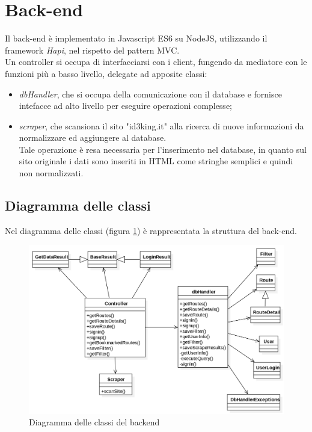 \documentclass[11pt]{report}
\begin{document}
\section{Back-end}
Il back-end è implementato in Javascript ES6 su NodeJS, utilizzando il framework \textit{Hapi}, nel rispetto del pattern MVC.
\\Un controller si occupa di interfacciarsi con i client, fungendo da mediatore con le funzioni più a basso livello, delegate ad apposite classi:
\begin{itemize}
	\item \textit{dbHandler}, che si occupa della comunicazione con il database e fornisce intefacce ad alto livello per eseguire operazioni complesse;
	\item \textit{scraper}, che scansiona il sito "id3king.it" alla ricerca di nuove informazioni da normalizzare ed aggiungere al database.
	\\Tale operazione è resa necessaria per l'inserimento nel database, in quanto sul sito originale i dati sono inseriti in HTML come stringhe semplici e quindi non normalizzati.
\end{itemize}
\subsection{Diagramma delle classi}
Nel diagramma delle classi (figura \ref{class_diagram_backend}) è rappresentata la struttura del back-end.
\begin{figure}
	\centering
	\includegraphics[scale=0.45]{ClassDiagram_Backend}
	\caption{Diagramma delle classi del backend \label{class_diagram_backend}}
\end{figure}
\end{document}
